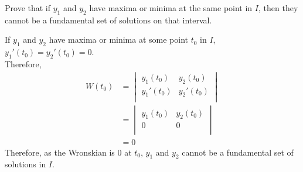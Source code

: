 \documentclass[fleqn, a4paper, 11pt, oneside]{amsart}
\theoremstyle{definition}
\theoremstyle{theorem}
\begin{document}
\begin{question}
	Prove that if $y_1$ and $y_2$ have maxima or minima at the same point in $I$, then they cannot be a fundamental set of solutions on that interval.
\end{question}

\begin{solution}
	If $y_1$ and $y_2$ have maxima or minima at some point $t_0$ in $I$, ${y_1}'(t_0) = {y_2}'(t_0) = 0$.\\
	Therefore,
	\begin{align*}
		W(t_0) &=
			\begin{vmatrix}
				y_1(t_0)    & y_2(t_0)    \\
				{y_1}'(t_0) & {y_2}'(t_0) \\
			\end{vmatrix}\\
		       &=
			\begin{vmatrix}
				y_1(t_0) & y_2(t_0) \\
				0        & 0        \\
			\end{vmatrix}\\
		       &= 0
	\end{align*}
	Therefore, as the Wronskian is $0$ at $t_0$, $y_1$ and $y_2$ cannot be a fundamental set of solutions in $I$.
\end{solution}
\end{document}
